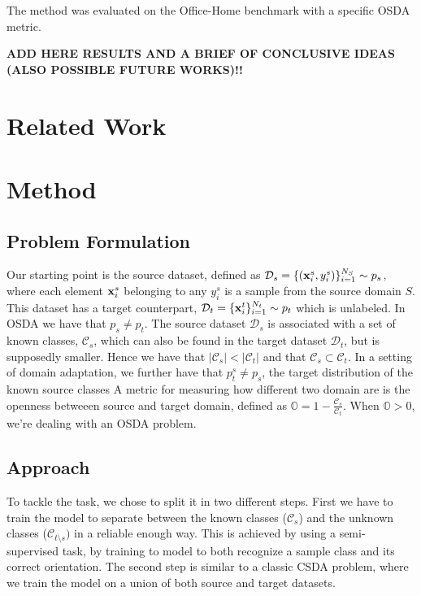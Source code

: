 \documentclass[10pt,twocolumn,letterpaper]{article}
\begin{document}
The method was evaluated on the Office-Home benchmark \cite{OfficeHomeDataset} with a specific OSDA metric.

{\bf ADD HERE RESULTS AND A BRIEF OF CONCLUSIVE IDEAS (ALSO POSSIBLE FUTURE WORKS)!!}

\section{Related Work}
\label{sec:relatedwork}


\section{Method}
\label{sec:method}

\subsection{Problem Formulation}
\label{sec:problemformulation}
Our starting point is the source dataset, defined as $\mathcal{D}_s = \{({\bf x}_i^s, y_i^s)\}_{i=1}^{N_S} \sim p_s$, where each element ${\bf x}_i^s$ belonging to any $y_i^s$ is a sample from the source domain $S$.
This dataset has a target counterpart, $\mathcal{D}_t = \{{\bf x}_i^t\}_{i=1}^{N_t} \sim p_t$ which is unlabeled.
In OSDA we have that $p_s \neq p_t$.
The source dataset $\mathcal{D}_s$ is associated with a set of known classes, $\mathcal{C}_s$, which can also be found in the target dataset $\mathcal{D}_t$, but is supposedly smaller.
Hence we have that $|\mathcal{C}_s| < |\mathcal{C}_t|$ and that $\mathcal{C}_s \subset \mathcal{C}_t$.
In a setting of domain adaptation, we further have that $p_t^s \neq p_s$, the target distribution of the known source classes
A metric for measuring how different two domain are is the openness betweeen source and target domain\cite{bendale2015open}, defined as $\displaystyle \mathbb{O} = 1-\frac{\mathcal{C}_s}{\mathcal{C}_t}$.
When $\mathbb{O} > 0$, we're dealing with an OSDA problem.

\subsection{Approach}
\label{sec:apporach}
To tackle the task, we chose to split it in two different steps.
First we have to train the model to separate between the known classes ($\mathcal{C}_s$) and the unknown classes ($\mathcal{C}_{t\setminus s})$ in a reliable enough way.
This is achieved by using a semi-supervised task, by training to model to both recognize a sample class and its correct orientation.
The second step is similar to a classic CSDA problem, where we train the model on a union of both source and target datasets.
\end{document}
